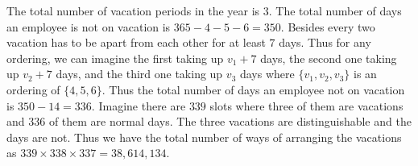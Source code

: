\documentclass[11pt]{article}
\begin{document}
\begin{Answer}
    The total number of vacation periods in the year is $3$. The total number of days an employee is not on 
    vacation is $365 - 4 - 5 - 6 = 350$. Besides every two vacation has to be apart from each other for 
    at least $7$ days. Thus for any ordering, we can imagine the first taking up $v_1 + 7$ days, the second 
    one taking up $v_2 + 7$ days, and the third one taking up $v_3$ days where $\{v_1, v_2, v_3\}$ is an 
    ordering of $\{4,5,6\}$. Thus the total number of days an employee not on vacation is $350 - 14 = 336$. 
    Imagine there are $339$ slots where three of them are vacations and $336$ of them are normal days. 
    The three vacations are distinguishable and the days are not. Thus we have the total number of ways of
    arranging the vacations as $339 \times 338 \times 337 = 38,614,134$. 
\end{Answer}

\newpage
{}
\end{document}
